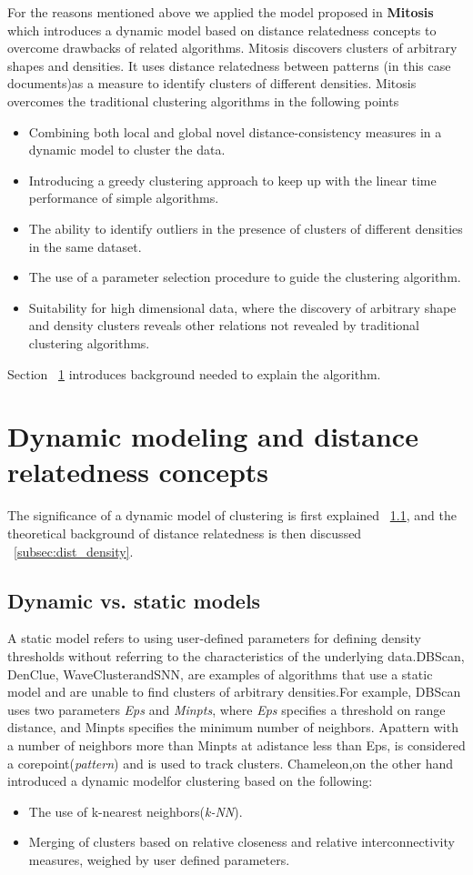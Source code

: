 For the reasons mentioned above we applied the model proposed in \textbf{Mitosis} \citep{Mitosis_1} which introduces a dynamic model based on distance relatedness concepts to overcome drawbacks of related algorithms. Mitosis discovers clusters of arbitrary shapes and densities. It uses distance relatedness between patterns (in this case documents)as a measure to identify clusters of different densities.
Mitosis overcomes the traditional clustering algorithms in the following points
\begin{itemize}
\item{Combining both local and global novel distance-consistency measures in a dynamic model to cluster the data.}
\item{Introducing a greedy clustering approach to keep up with the linear time performance of simple algorithms.}
\item{The ability to identify outliers in the presence of clusters of different densities in the same dataset.}
\item{The use of a parameter selection procedure to guide the clustering algorithm.}
\item{Suitability for high dimensional data, where the discovery of arbitrary shape and density clusters reveals other relations not revealed by traditional clustering algorithms.}
\end{itemize}
Section ~\ref{sec:background} introduces background needed to explain the algorithm.
\section{Dynamic modeling and distance relatedness concepts}\label{sec:background}

The significance of a dynamic model of clustering is first explained ~\ref{subsec:dynamic_static}, and the theoretical background of distance relatedness is then discussed ~\ref{subsec:dist_density}.

\subsection{Dynamic vs. static models}\label{subsec:dynamic_static}
A static model refers to using user-defined parameters for defining density thresholds without referring to the characteristics of the underlying data.DBScan, DenClue, WaveClusterandSNN, are examples of algorithms that use a static model and are unable to find clusters of arbitrary densities.For example, DBScan uses two parameters \textit{Eps} and \textit{Minpts}, where \textit{Eps} specifies a threshold on range distance,
and Minpts specifies the minimum number of neighbors.
Apattern with a number of neighbors more than Minpts at adistance less than Eps, is considered a corepoint(\textit{pattern}) and is used to track clusters. Chameleon,on the other hand introduced a dynamic modelfor
clustering based on the following:
\begin{itemize}
\item The use of k-nearest neighbors(\textit{k-NN}).
\item Merging of clusters based on relative closeness and relative interconnectivity measures, weighed by user defined parameters.
\end{itemize}


